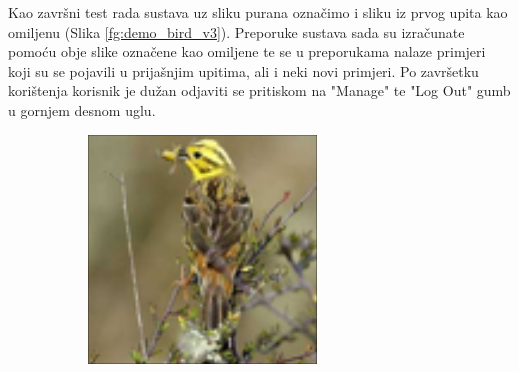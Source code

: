 \documentclass[times, utf8, proizvoljni, numeric]{fer}
\begin{document}
\newpage

Kao završni test rada sustava uz sliku purana označimo i sliku iz prvog upita kao omiljenu (Slika \ref{fg:demo_bird_v3}). Preporuke sustava sada su izračunate pomoću obje slike označene kao omiljene te se u preporukama nalaze primjeri koji su se pojavili u prijašnjim upitima, ali i neki novi primjeri. Po završetku korištenja korisnik je dužan odjaviti se pritiskom na "Manage" te "Log Out" gumb u gornjem desnom uglu.


\begin{figure}[ht!]
	\begin{subfigure}[t]{0.19\textwidth}
		\includegraphics[width=\textwidth,height=\textwidth ]{./imgs/demo-preporucitelja-po-sadrzaju/tijek-rada/id@0.png}
	\end{subfigure}
	\begin{subfigure}[t]{0.19\textwidth}

\end{subfigure}
\end{figure}
\end{document}
